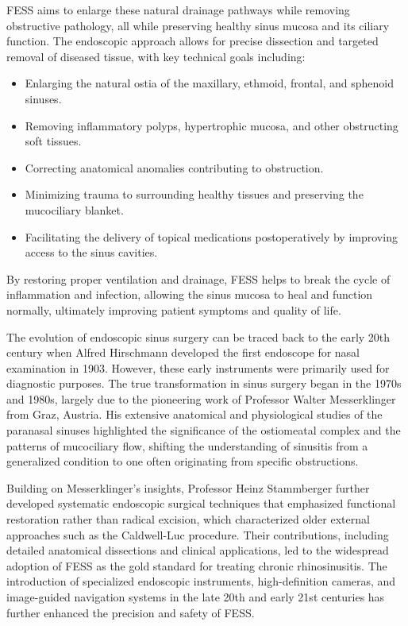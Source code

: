 FESS aims to enlarge these natural drainage pathways while removing obstructive pathology, all while preserving healthy sinus mucosa and its ciliary function. The endoscopic approach allows for precise dissection and targeted removal of diseased tissue, with key technical goals including:

\begin{itemize}
  \item Enlarging the natural ostia of the maxillary, ethmoid, frontal, and sphenoid sinuses.
  \item Removing inflammatory polyps, hypertrophic mucosa, and other obstructing soft tissues.
  \item Correcting anatomical anomalies contributing to obstruction.
  \item Minimizing trauma to surrounding healthy tissues and preserving the mucociliary blanket.
  \item Facilitating the delivery of topical medications postoperatively by improving access to the sinus cavities.
\end{itemize}

By restoring proper ventilation and drainage, FESS helps to break the cycle of inflammation and infection, allowing the sinus mucosa to heal and function normally, ultimately improving patient symptoms and quality of life.

The evolution of endoscopic sinus surgery can be traced back to the early 20th century when Alfred Hirschmann developed the first endoscope for nasal examination in 1903. However, these early instruments were primarily used for diagnostic purposes. The true transformation in sinus surgery began in the 1970s and 1980s, largely due to the pioneering work of Professor Walter Messerklinger from Graz, Austria. His extensive anatomical and physiological studies of the paranasal sinuses highlighted the significance of the ostiomeatal complex and the patterns of mucociliary flow, shifting the understanding of sinusitis from a generalized condition to one often originating from specific obstructions.

Building on Messerklinger's insights, Professor Heinz Stammberger further developed systematic endoscopic surgical techniques that emphasized functional restoration rather than radical excision, which characterized older external approaches such as the Caldwell-Luc procedure. Their contributions, including detailed anatomical dissections and clinical applications, led to the widespread adoption of FESS as the gold standard for treating chronic rhinosinusitis. The introduction of specialized endoscopic instruments, high-definition cameras, and image-guided navigation systems in the late 20th and early 21st centuries has further enhanced the precision and safety of FESS.

